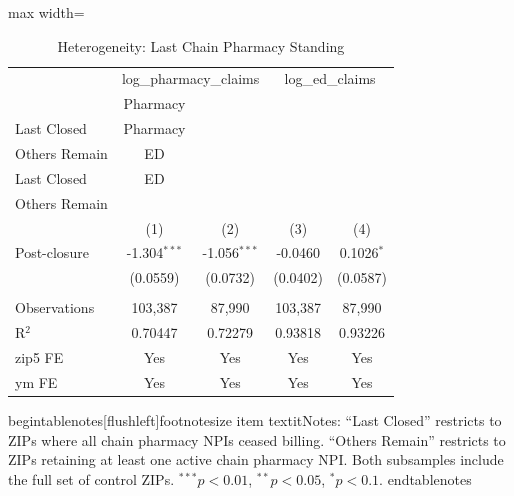 \begin{table}[htbp]
   \caption{\label{tab:het} Heterogeneity: Last Chain Pharmacy Standing}
   \bigskip
   \centering
   \begin{adjustbox}{max width=\textwidth}
\begin{tabular}{lcccc}
      \toprule
       & \multicolumn{2}{c}{log\_pharmacy\_claims} & \multicolumn{2}{c}{log\_ed\_claims}\\
                   & Pharmacy\\Last Closed   & Pharmacy\\Others Remain   & ED\\Last Closed   & ED\\Others Remain \\     
                   & (1)                     & (2)                       & (3)               & (4)\\  
      \midrule 
      Post-closure & -1.304$^{***}$          & -1.056$^{***}$            & -0.0460           & 0.1026$^{*}$\\   
                   & (0.0559)                & (0.0732)                  & (0.0402)          & (0.0587)\\   
       \\
      Observations & 103,387                 & 87,990                    & 103,387           & 87,990\\  
      R$^2$        & 0.70447                 & 0.72279                   & 0.93818           & 0.93226\\  
      \midrule 
      zip5 FE      & Yes                     & Yes                       & Yes               & Yes\\  
      ym FE        & Yes                     & Yes                       & Yes               & Yes\\  
      \bottomrule
   \end{tabular}
\end{adjustbox}
begin{tablenotes}[flushleft]footnotesize
item textit{Notes:} ``Last Closed'' restricts to ZIPs where all chain pharmacy NPIs ceased billing. ``Others Remain'' restricts to ZIPs retaining at least one active chain pharmacy NPI. Both subsamples include the full set of control ZIPs. $^{***}p<0.01$, $^{**}p<0.05$, $^{*}p<0.1$.
end{tablenotes}
\end{table}
